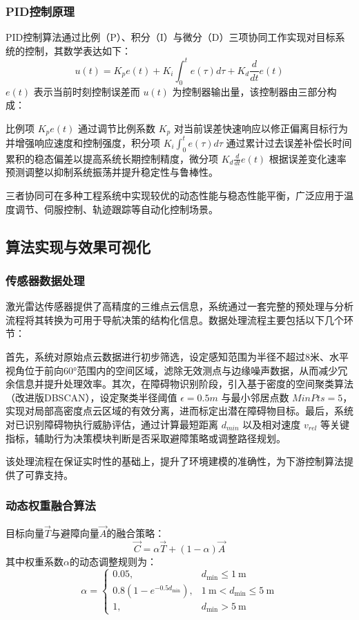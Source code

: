 \subsubsection{PID控制原理}

PID控制算法通过比例（P）、积分（I）与微分（D）三项协同工作实现对目标系统的控制，其数学表达如下：
\[
u(t) = K_p e(t) + K_i \int_0^t e(\tau) d\tau + K_d \frac{d}{dt} e(t)
\]
 $e(t)$ 表示当前时刻控制误差而 $u(t)$ 为控制器输出量，该控制器由三部分构成：

比例项 $K_p e(t)$ 通过调节比例系数 $K_p$ 对当前误差快速响应以修正偏离目标行为并增强响应速度和控制强度，积分项 $K_i \int_0^t e(\tau) d\tau$  通过累计过去误差补偿长时间累积的稳态偏差以提高系统长期控制精度，微分项  $K_d \frac{d}{dt} e(t)$ 根据误差变化速率预测调整以抑制系统振荡并提升稳定性与鲁棒性。

三者协同可在多种工程系统中实现较优的动态性能与稳态性能平衡，广泛应用于温度调节、伺服控制、轨迹跟踪等自动化控制场景。

\subsection{算法实现与效果可视化}

\subsubsection{传感器数据处理}

激光雷达传感器提供了高精度的三维点云信息，系统通过一套完整的预处理与分析流程将其转换为可用于导航决策的结构化信息。数据处理流程主要包括以下几个环节：

首先，系统对原始点云数据进行初步筛选，设定感知范围为半径不超过8米、水平视角位于前向60°范围内的空间区域，滤除无效测点与边缘噪声数据，从而减少冗余信息并提升处理效率。其次，在障碍物识别阶段，引入基于密度的空间聚类算法（改进版DBSCAN），设定聚类半径阈值 $\epsilon=0.5m$ 与最小邻居点数 $MinPts=5$，实现对局部高密度点云区域的有效分离，进而标定出潜在障碍物目标。最后，系统对已识别障碍物执行威胁评估，通过计算最短距离 $d_{min}$ 以及相对速度 $v_{rel}$ 等关键指标，辅助行为决策模块判断是否采取避障策略或调整路径规划。

该处理流程在保证实时性的基础上，提升了环境建模的准确性，为下游控制算法提供了可靠支持。

\subsubsection{动态权重融合算法}
目标向量$\vec{T}$与避障向量$\vec{A}$的融合策略：
\begin{equation}
	\vec{C} = \alpha \vec{T} + (1-\alpha)\vec{A}
\end{equation}
其中权重系数$\alpha$的动态调整规则为：
\begin{equation}
    \alpha = 
    \begin{cases}
        0.05, & d_{\text{min}} \leq 1\ \text{m} \\
        0.8(1 - e^{-0.5d_{\text{min}}}), & 1\ \text{m} < d_{\text{min}} \leq 5\ \text{m} \\
        1, & d_{\text{min}} > 5\ \text{m}
    \end{cases}
\end{equation}

